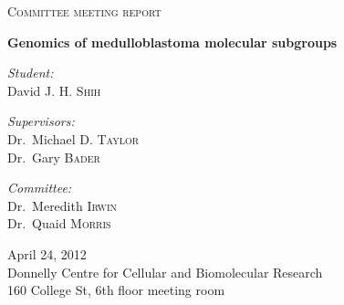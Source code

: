 \begin{titlepage}

\setlength{\topmargin}{30mm}

\begin{center}
 
\textsc{\Large Committee meeting report}\bigskip

{\huge \bfseries Genomics of medulloblastoma molecular subgroups}\\[10mm]

\begin{minipage}{0.6\textwidth}
\begin{multicols}{2}
	\begin{flushleft}
		\large \emph{Student:}\\
		David J. H. \textsc{Shih}
	\end{flushleft}
	\vfill
	\columnbreak
	\begin{flushright}
		\large \emph{Supervisors:}\\
		Dr.~Michael D. \textsc{Taylor}\\
		Dr.~Gary \textsc{Bader}\\
	\end{flushright}
	\begin{flushright}
		\large \emph{Committee:}\\
		Dr.~Meredith \textsc{Irwin}\\
		Dr.~Quaid \textsc{Morris}
	\end{flushright}
\end{multicols}
\end{minipage}

\vspace{100mm}

{ \large 
April 24, 2012\\
\medskip
Donnelly Centre for Cellular and Biomolecular Research\\
160 College St, 6th floor meeting room
}

\end{center}

\end{titlepage}
